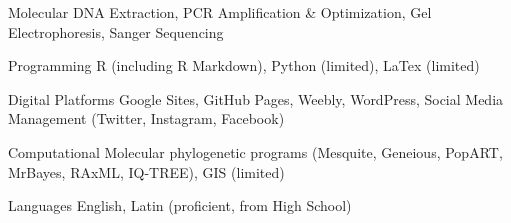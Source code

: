 

\begin{cvskills}

  \cvskill
    {Molecular} %
    {DNA Extraction, PCR Amplification \& Optimization, Gel Electrophoresis, Sanger Sequencing} %

  \cvskill
    {Programming} %
    {R (including R Markdown), Python (limited), LaTex (limited)} %

  \cvskill
    {Digital Platforms} %
    {Google Sites, GitHub Pages, Weebly, WordPress, Social Media Management (Twitter, Instagram, Facebook)} %

  \cvskill
    {Computational} %
    {Molecular phylogenetic programs (Mesquite, Geneious, PopART, MrBayes, RAxML, IQ-TREE), GIS (limited)} %

  \cvskill
    {Languages} %
    {English, Latin (proficient, from High School)} %

\end{cvskills}
